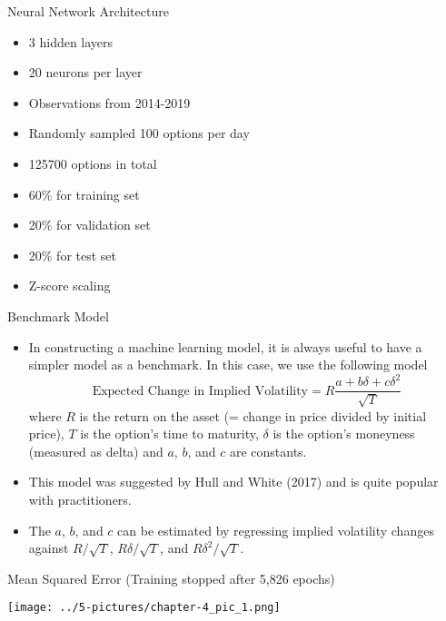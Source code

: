 \documentclass[11pt]{beamer}
\begin{document}
\begin{frame}{Neural Network Architecture}
\begin{itemize}
\item 3 hidden layers
\item 20 neurons per layer
\item Observations from 2014-2019
\item Randomly sampled 100 options per day
\item 125700 options in total
\item 60\% for training set
\item 20\% for validation set
\item 20\% for test set
\item Z-score scaling
\end{itemize}
\end{frame}
\begin{frame}{Benchmark Model}
\begin{itemize}
\item In constructing a machine learning model, it is always useful to have
a simpler model as a benchmark. In this case, we use the following model
\begin{equation}
\text{Expected Change in Implied Volatility} =R \frac{a+b\delta+c\delta^2}{\sqrt{T}}
\end{equation}
where $R$ is the return on the asset (= change in price divided by initial
price), $T$ is the option’s time to maturity, $\delta$ is the option’s moneyness
(measured as delta) and $a$, $b$, and $c$ are constants. 
\item This model was suggested
by Hull and White (2017) and is quite popular with practitioners.
\item The $a$, $b$, and $c$ can be estimated by regressing implied volatility changes
against $R/\sqrt{T}$, $R\delta/\sqrt{T}$, and $R\delta^2/\sqrt{T}$.
\end{itemize}
\end{frame}
\begin{frame}{Mean Squared Error (Training stopped after 5,826 epochs)}
	 
	\begin{center}
	\texttt{[image: ../5-pictures/chapter-4\_pic\_1.png]}
	\end{center}
\end{frame}
\end{document}
